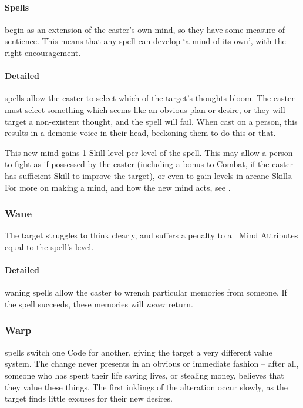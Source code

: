 \begin{multicols}{2}
\paragraph{Spells}
  begin as an extension of the caster's own mind, so they have some measure of sentience.
  This means that any spell can develop `a mind of its own', with the right encouragement.

    \paragraph{Detailed}
      spells allow the caster to select which of the target's thoughts bloom.
      The caster must select something which seems like an obvious plan or desire, or they will target a non-existent thought, and the spell will fail.
      When cast on a person, this results in a demonic voice in their head, beckoning them to do this or that.

      This new mind gains 1 Skill level per level of the spell.
      This may allow a person to fight as if possessed by the caster (including a bonus to Combat, if the caster has sufficient Skill to improve the target), or even to gain levels in arcane Skills.
    For more on making a mind, and how the new mind acts, see .

\subsubsection{Wane}
The target struggles to think clearly, and suffers a penalty to all Mind Attributes equal to the spell's level.

\paragraph{Detailed}
waning spells allow the caster to wrench particular memories from someone.
If the spell succeeds, these memories will \emph{never} return.
\subsubsection{Warp}
spells switch one Code for another, giving the target a very different value system.
The change never presents in an obvious or immediate fashion -- after all, someone who has spent their life saving lives, or stealing money, believes that they value these things.
The first inklings of the alteration occur slowly, as the target finds little excuses for their new desires.


\end{multicols}
